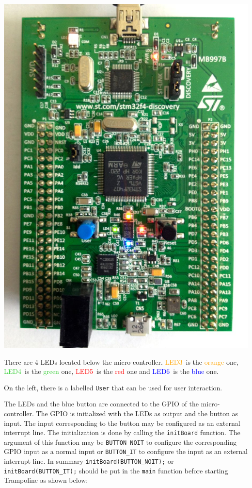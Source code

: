 \documentclass[11pt]{article}
\newcommand{\LEDorange}{\textcolor{orange}{LED3}}
\newcommand{\LEDgreen}{\textcolor{LimeGreen}{LED4}}
\newcommand{\LEDred}{\textcolor{red}{LED5}}
\newcommand{\LEDblue}{\textcolor{blue}{LED6}}
\begin{document}
\begin{center}
\includegraphics[width=.8\textwidth]{discovery.jpg} 
\end{center}

There are 4 LEDs located below the micro-controller. \LEDorange\ is the \textcolor{orange}{orange} one,  \LEDgreen\  is the \textcolor{LimeGreen}{green} one, \LEDred\ is the \textcolor{red}{red} one and \LEDblue\ is the \textcolor{blue}{blue} one. 

On the left, there is a  labelled \texttt{User} that can be used for user interaction.

The LEDs and the blue button are connected to the GPIO of the micro-controller. The GPIO is initialized with the LEDs as output and the button as input. The input corresponding to the button may be configured as an external interrupt line. The initialization is done by calling the \lstinline{initBoard} function. The argument of this function may be \lstinline{BUTTON_NOIT} to configure the corresponding GPIO input as a normal input or  \lstinline{BUTTON_IT} to configure the input as an external interrupt line. In summary \lstinline{initBoard(BUTTON_NOIT);} or \lstinline{initBoard(BUTTON_IT);} should be put in the \lstinline{main} function before starting Trampoline as shown below:
\end{document}
